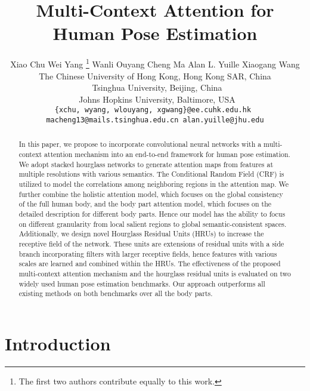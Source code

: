 \documentclass[10pt,twocolumn,letterpaper]{article}
\begin{document}
\title{Multi-Context Attention for Human Pose Estimation}
\author{
Xiao Chu \quad Wei Yang
\thanks{ The first two authors contribute equally to this work.} \quad Wanli Ouyang \quad Cheng Ma \quad Alan L. Yuille \quad Xiaogang Wang \\
 The Chinese University of Hong Kong, Hong Kong SAR, China\\
~Tsinghua University, Beijing, China\\
~Johns Hopkins University, Baltimore, USA\\
{\tt\small \{xchu, wyang, wlouyang, xgwang\}@ee.cuhk.edu.hk  } \\
{\tt\small  macheng13@mails.tsinghua.edu.cn \quad  alan.yuille@jhu.edu}
}

\maketitle


\begin{abstract}
In this paper, we propose to incorporate convolutional neural networks with a multi-context attention mechanism into an end-to-end framework for human pose estimation. 
We adopt stacked hourglass networks to generate attention maps from features at multiple resolutions with various semantics. 
The Conditional Random Field (CRF) is utilized to model the correlations among neighboring regions in the attention map.
We further combine  the holistic attention model, which focuses on the global consistency of the full human body, and the body part attention model, which focuses on the detailed description for different body parts. Hence our model has the ability to focus on different granularity from local salient regions to global semantic-consistent spaces.
Additionally, we design novel Hourglass Residual Units (HRUs) to increase the receptive field of the network. These units are extensions of residual units with a side branch incorporating filters with larger receptive fields, hence features with various scales are learned and combined within the HRUs. 
The effectiveness of the proposed multi-context attention mechanism and the hourglass residual units is evaluated on two widely used human pose estimation benchmarks. Our approach outperforms all existing methods on both benchmarks over all the body parts. 
\end{abstract}






\vspace{-1em}
\section{Introduction}
\end{document}
